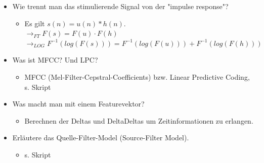 \documentclass[11pt]{article}
\begin{document}
\begin{itemize}
\begin{itemize}
\end{itemize}
\item Wie trennt man das stimulierende Signal von der "impulse response"?
\begin{itemize}
\item Es gilt $s(n) = u(n) *  h(n)$. \\ $\rightarrow_{FT} F(s) = F(u) \cdot F(h)$ \\ $\rightarrow_{LOG} F^{-1}(log(F(s))) = F^{-1}(log(F(u))) + F^{-1}(log(F(h)))$
\end{itemize}
\item Was ist MFCC? Und LPC?
\begin{itemize}
\item MFCC (Mel-Filter-Cepstral-Coefficients) bzw. Linear Predictive Coding, s. Skript
\end{itemize}
\item Was macht man mit einem Featurevektor? 
\begin{itemize}
\item Berechnen der Deltas und DeltaDeltas um Zeitinformationen zu erlangen.
\end{itemize}
\item Erläutere das Quelle-Filter-Model (Source-Filter Model). 
\begin{itemize}
\item s. Skript
\end{itemize}
\end{itemize}
\end{document}
